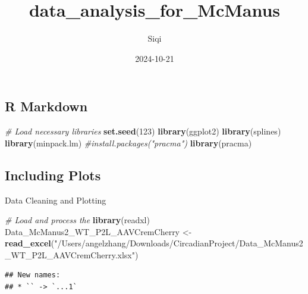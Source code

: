 \documentclass[
]{article}
\title{data\_analysis\_for\_McManus}
\author{Siqi}
\date{2024-10-21}
\newenvironment{Shaded}{\begin{snugshade}}{\end{snugshade}}
\newcommand{\CommentTok}[1]{\textcolor[rgb]{0.56,0.35,0.01}{\textit{#1}}}
\newcommand{\DecValTok}[1]{\textcolor[rgb]{0.00,0.00,0.81}{#1}}
\newcommand{\FunctionTok}[1]{\textcolor[rgb]{0.13,0.29,0.53}{\textbf{#1}}}
\newcommand{\NormalTok}[1]{#1}
\newcommand{\OtherTok}[1]{\textcolor[rgb]{0.56,0.35,0.01}{#1}}
\newcommand{\StringTok}[1]{\textcolor[rgb]{0.31,0.60,0.02}{#1}}
\begin{document}
\maketitle

\hypertarget{r-markdown}{%
\subsection{R Markdown}\label{r-markdown}}

\begin{Shaded}
\begin{Highlighting}[]
\CommentTok{\# Load necessary libraries}
\FunctionTok{set.seed}\NormalTok{(}\DecValTok{123}\NormalTok{)}
\FunctionTok{library}\NormalTok{(ggplot2)}
\FunctionTok{library}\NormalTok{(splines)}
\FunctionTok{library}\NormalTok{(minpack.lm)}
\CommentTok{\#install.packages("pracma") }
\FunctionTok{library}\NormalTok{(pracma)}
\end{Highlighting}
\end{Shaded}

\hypertarget{including-plots}{%
\subsection{Including Plots}\label{including-plots}}

Data Cleaning and Plotting

\begin{Shaded}
\begin{Highlighting}[]
\CommentTok{\# Load and process the  }
\FunctionTok{library}\NormalTok{(readxl)}
\NormalTok{Data\_McManus2\_WT\_P2L\_AAVCremCherry }\OtherTok{\textless{}{-}} \FunctionTok{read\_excel}\NormalTok{(}\StringTok{"/Users/angelzhang/Downloads/CircadianProject/Data\_McManus2\_WT\_P2L\_AAVCremCherry.xlsx"}\NormalTok{)}
\end{Highlighting}
\end{Shaded}

\begin{verbatim}
## New names:
## * `` -> `...1`
\end{verbatim}
\end{document}
